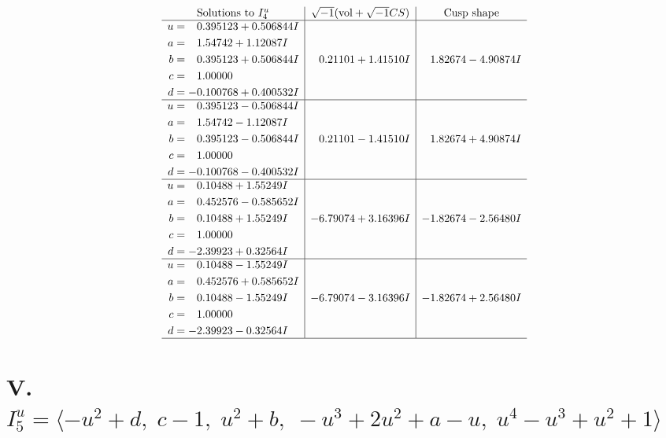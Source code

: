 \documentclass[1p]{elsarticle_modified}
\theoremstyle{definition}
\newcommand{\I}{\sqrt{-1}}
\begin{document}
$$\begin{array}{c|c|c}  
\text{Solutions to }I^u_{4}& \I (\text{vol} + \sqrt{-1}CS) & \text{Cusp shape}\\
 \hline 
\begin{aligned}
u &= \phantom{-}0.395123 + 0.506844 I \\
a &= \phantom{-}1.54742 + 1.12087 I \\
b &= \phantom{-}0.395123 + 0.506844 I \\
c &= \phantom{-}1.00000\phantom{ +0.000000I} \\
d &= -0.100768 + 0.400532 I\end{aligned}
 & \phantom{-}0.21101 + 1.41510 I & \phantom{-}1.82674 - 4.90874 I \\ \hline\begin{aligned}
u &= \phantom{-}0.395123 - 0.506844 I \\
a &= \phantom{-}1.54742 - 1.12087 I \\
b &= \phantom{-}0.395123 - 0.506844 I \\
c &= \phantom{-}1.00000\phantom{ +0.000000I} \\
d &= -0.100768 - 0.400532 I\end{aligned}
 & \phantom{-}0.21101 - 1.41510 I & \phantom{-}1.82674 + 4.90874 I \\ \hline\begin{aligned}
u &= \phantom{-}0.10488 + 1.55249 I \\
a &= \phantom{-}0.452576 - 0.585652 I \\
b &= \phantom{-}0.10488 + 1.55249 I \\
c &= \phantom{-}1.00000\phantom{ +0.000000I} \\
d &= -2.39923 + 0.32564 I\end{aligned}
 & -6.79074 + 3.16396 I & -1.82674 - 2.56480 I \\ \hline\begin{aligned}
u &= \phantom{-}0.10488 - 1.55249 I \\
a &= \phantom{-}0.452576 + 0.585652 I \\
b &= \phantom{-}0.10488 - 1.55249 I \\
c &= \phantom{-}1.00000\phantom{ +0.000000I} \\
d &= -2.39923 - 0.32564 I\end{aligned}
 & -6.79074 - 3.16396 I & -1.82674 + 2.56480 I\\
 \hline 
 \end{array}$$\newpage\newpage\renewcommand{\arraystretch}{1}
\centering \section*{V. $I^u_{5}= \langle - u^2+d,\;c-1,\;u^2+b,\;- u^3+2 u^2+a- u,\;u^4- u^3+u^2+1 \rangle$}
\end{document}

